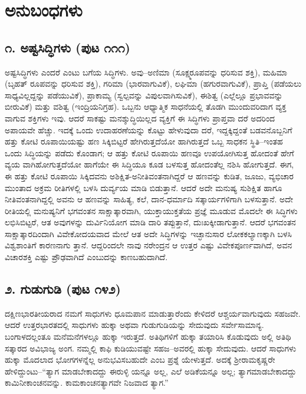 
\chapter{ಅನುಬಂಧಗಳು}

\section{೧. ಅಷ್ಟಸಿದ್ಧಿಗಳು (ಪುಟ ೧೧೧)}

ಅಷ್ಟಸಿದ್ಧಿಗಳು ಎಂದರೆ ಎಂಟು ಬಗೆಯ ಸಿದ್ಧಿಗಳು. ಅವು–ಅಣಿಮಾ (ಸೂಕ್ಷ್ಮರೂಪವನ್ನು ಧರಿಸುವ ಶಕ್ತಿ), ಮಹಿಮಾ (ಬೃಹತ್ ರೂಪವನ್ನು ಧರಿಸುವ ಶಕ್ತಿ), ಗರಿಮಾ (ಭಾರವಾಗುವಿಕೆ), ಲಘಿಮಾ (ಹಗುರವಾಗುವಿಕೆ), ಪ್ರಾಪ್ತಿ (ಪಡೆಯಲು ಸಾಧ್ಯವಿಲ್ಲದ್ದನ್ನು ಪಡೆಯುವಿಕೆ), ಪ್ರಾಕಾಮ್ಯ (ಸ್ವಲ್ಪವನ್ನು ವಿಪುಲವಾಗಿಸುವಿಕೆ), ಈಶಿತ್ವ (ಎಲ್ಲೆಲ್ಲೂ ಪ್ರಭಾವವನ್ನು ಬೀರುವಿಕೆ) ಮತ್ತು ವಶಿತ್ವ (ಇಂದ್ರಿಯನಿಗ್ರಹ). ಒಬ್ಬನು ಆಧ್ಯಾತ್ಮಿಕ ಸಾಧನೆಯಲ್ಲಿ ತೊಡಗಿ ಮುಂದುವರಿದಾಗ ವ್ಯಕ್ತ ವಾಗುವ ಶಕ್ತಿಗಳು ಇವು. ಆದರೆ ಸಾಕಷ್ಟು ಮನಶ್ಶುದ್ಧಿಯಿಲ್ಲದ ವ್ಯಕ್ತಿಗೆ ಈ ಸಿದ್ಧಿಗಳು ಪ್ರಾಪ್ತವಾ ದರೆ ಅದರಿಂದ ಅಪಾಯವೇ ಹೆಚ್ಚು. ಇದಕ್ಕೆ ಒಂದು ಉದಾಹರಣೆಯನ್ನು ಕೊಟ್ಟು ಹೇಳುವುದಾ ದರೆ, ಇದ್ದಕ್ಕಿದ್ದಂತೆ ಬಡವನೊಬ್ಬನಿಗೆ ಹತ್ತು ಕೋಟಿ ರೂಪಾಯಿಯಷ್ಟು ಹಣ ಸಿಕ್ಕಿಬಿಟ್ಟರೆ ಹೇಗಿರುತ್ತದೆಯೋ ಹಾಗಿರುತ್ತದೆ ಒಬ್ಬ ಸಾಧಕನ ಸ್ಥಿತಿ–ಇಂತಹ ಒಂದು ಸಿದ್ಧಿಯನ್ನು ಪಡೆದು ಕೊಂಡಾಗ; ಆ ಹತ್ತು ಕೋಟಿ ರೂಪಾಯಿ ಹಣವೂ ಉಪಯೋಗಿಸುತ್ತ ಹೋದಂತೆ ಹೇಗೆ ವ್ಯಯ ವಾಗಿಹೋಗುತ್ತದೆಯೋ ಹಾಗೆಯೇ ಈ ಸಿದ್ಧಿಯೂ ಕೂಡ ಬಳಸುತ್ತ ಹೋದಂತೆಲ್ಲ ನಶಿಸಿ ಹೋಗುತ್ತದೆ. ಈಗ, ಈ ಹತ್ತು ಕೋಟಿ ರೂಪಾಯಿ ಸಿಕ್ಕಿದವನು ಅಶಿಕ್ಷಿತ-ಅನೀತಿವಂತನಾಗಿದ್ದರೆ ಆ ಹಣವನ್ನು ಕುಡಿತ, ಜೂಜು, ವ್ಯಭಿಚಾರ ಮುಂತಾದ ಅಕ್ರಮ ರೀತಿಗಳಲ್ಲಿ ಬಳಸಿ ದುರ್ವ್ಯಯ ಮಾಡಿ ಬಿಡುತ್ತಾನೆ. ಆದರೆ ಅದೇ ಮನುಷ್ಯ ಸುಶಿಕ್ಷಿತ ಹಾಗೂ ನೀತಿವಂತನಾಗಿದ್ದಲ್ಲಿ ಅವನು ಆ ಹಣವನ್ನು ಸಾಹಿತ್ಯ, ಕಲೆ, ದಾನ-ಧರ್ಮಾದಿ ಸತ್ಕಾರ್ಯಗಳಿಗಾಗಿ ಬಳಸುತ್ತಾನೆ. ಅದೇ ರೀತಿಯಲ್ಲಿ ಮನುಷ್ಯನಿಗೆ ಭಗವಂತನ ಸಾಕ್ಷಾತ್ಕಾರವಾಗಿ, ಯುಕ್ತಾಯುಕ್ತತೆಯ ಪ್ರಜ್ಞೆ ಮೂಡುವ ಮೊದಲೇ ಈ ಸಿದ್ಧಿಗಳು ಲಭಿಸಿಬಿಟ್ಟರೆ, ಆತ ಅವುಗಳನ್ನು ದುರ್ವಿನಿಯೋಗ ಮಾಡಿ ದಾರಿ ತಪ್ಪುತ್ತಾನೆ, ದುಃಖಕ್ಕೀಡಾಗುತ್ತಾನೆ. ಆದರೆ ಭಗವಂತನ ಸಾಕ್ಷಾತ್ಕಾರದಿಂದಾಗಿ ವಿವೇಕೋದಯವಾದ ಮೇಲೆ ಆತ ಅದೇ ಸಿದ್ಧಿಗಳನ್ನು ಇಚ್ಛಾನುಸಾರ ಲೋಕಕಲ್ಯಾಣಕ್ಕಾಗಿ ಬಳಸಿ ವಿಶ್ವಶಾಂತಿಗೆ ಕಾರಣನಾಗು ತ್ತಾನೆ. ಆದ್ದರಿಂದಲೇ ನಾವು ನರೇಂದ್ರನ ಆ ಉತ್ತರ ಎಷ್ಟು ವಿವೇಕಪೂರ್ಣವಾಗಿದೆ, ಅವನ ವಿಚಾರಶಕ್ತಿ ಎಷ್ಟು ಪ್ರೌಢವಾಗಿದೆ ಎಂಬುದನ್ನು ಕಾಣಬಹುದಾಗಿದೆ.


\section{೨. ಗುಡುಗುಡಿ (ಪುಟ ೧೪೨)}

ದಕ್ಷಿಣಭಾರತೀಯರಾದ ನಮಗೆ ಸಾಧುಗಳು ಧೂಮಪಾನ ಮಾಡುತ್ತಾರೆಂದು ಕೇಳಿದರೆ ಆಶ್ಚರ್ಯವಾಗುವುದು ಸಹಜವೇ. ಆದರೆ ಉತ್ತರಭಾರತದಲ್ಲಿ ಸಾಧುಗಳು ಹುಕ್ಕಾ ಅಥವಾ ಗುಡುಗುಡಿಯನ್ನು ಸೇದುವುದು ಸರ್ವೇಸಾಮಾನ್ಯ. ಬಂಗಾಳದಲ್ಲಂತೂ ಮನೆಮನೆಗಳಲ್ಲೂ ಹುಕ್ಕಾ ಇರುತ್ತದೆ. ಅತಿಥಿಗಳಿಗೆ ಹುಕ್ಕಾ ತಯಾರಿಸಿ ಕೊಡುವುದು ಅಲ್ಲಿ ಅತಿಥಿ ಸತ್ಕಾರದ ಅವಿಭಾಜ್ಯ ಅಂಗ. ನಮ್ಮಲ್ಲಿ ಕಾಫಿ ಕುಡಿಯುವಷ್ಟೇ ಸಹಜ–ಅವರಲ್ಲಿ ಹುಕ್ಕಾ ಸೇದುವುದು. ಆದರೆ ಸಾಧುಗಳು ಹುಕ್ಕಾ ಮೊದಲಾದ ಭೋಗಗಳನ್ನೆಲ್ಲ ಅನುಭವಿಸಬಹುದೇ ಎಂಬ ಪ್ರಶ್ನೆ ಯೇಳುತ್ತದೆ. ಅದಕ್ಕೆ ಶ್ರೀರಾಮಕೃಷ್ಣರೇ ಹೇಳಿದ್ದುಂಟು–“ತ್ಯಾಗ ಮಾಡಬೇಕಾದದ್ದು ಈರುಳ್ಳಿ ಯನ್ನೂ ಅಲ್ಲ, ಎಲೆ ಅಡಿಕೆಯನ್ನೂ ಅಲ್ಲ; ತ್ಯಾಗಮಾಡಬೇಕಾದದ್ದು ಕಾಮಿನೀಕಾಂಚನವನ್ನು. ಕಾಮಕಾಂಚನತ್ಯಾಗವೇ ನಿಜವಾದ ತ್ಯಾಗ.”


